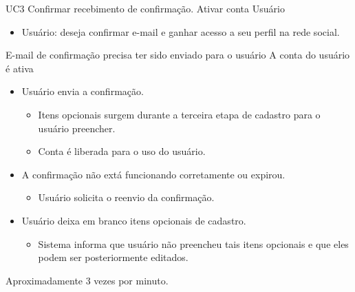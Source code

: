 
\casoDeUso
{UC3}
{Confirmar recebimento de confirmação. Ativar conta}
{Usuário}
{
\begin{itemize}
	\item Usuário: deseja confirmar e-mail e ganhar acesso a seu perfil na rede social.
\end{itemize}

}
{E-mail de confirmação precisa ter sido enviado para o usuário}
{A conta do usuário é ativa}
{
\begin{itemize}
	\item Usuário envia a confirmação.
	\begin{itemize}		
		\item Itens opcionais surgem durante a terceira etapa de cadastro para o usuário preencher.
		
		\item Conta é liberada para o uso do usuário.
	\end{itemize}	 
\end{itemize}
}
{
\begin{itemize}
	\item A confirmação não extá funcionando corretamente ou expirou.
	\begin{itemize}
		\item Usuário solicita o reenvio da confirmação.
	\end{itemize}
	\item Usuário deixa em branco itens opcionais de cadastro.
	\begin{itemize}
		\item Sistema informa que usuário não preencheu tais itens opcionais e que eles podem ser posteriormente editados.
	\end{itemize}
\end{itemize}
}
{Aproximadamente 3 vezes por minuto.}
{

}

